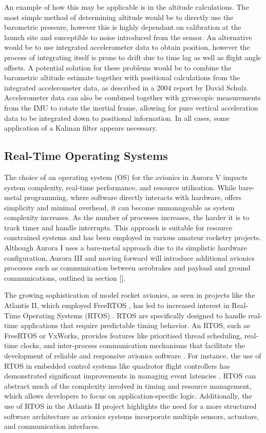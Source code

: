 An example of how this may be applicable is in the altitude calculations. The most simple method of determining altitude would be to directly use the barometric pressure, however this is highly dependant on calibration at the launch site and susceptible to noise introduced from the sensor. An alternative would be to use integrated accelerometer data to obtain position, however the process of integrating itself is prone to drift due to time lag as well as flight angle offsets. A potential solution for these problems would be to combine the barometric altitude estimate together with positional calculations from the integrated accelerometer data, as described in a 2004 report by David Schulz\cite{kalman-apogee}. Accelerometer data can also be combined together with gyroscopic measurements from the IMU to rotate the inertial frame, allowing for pure vertical acceleration data to be integrated down to positional information. In all cases, some application of a Kalman filter appears necessary.

\subsection{Real-Time Operating Systems}
The choice of an operating system (OS) for the avionics in Aurora V impacts system complexity, real-time performance, and resource utilisation. While bare-metal programming, where software directly interacts with hardware, offers simplicity and minimal overhead, it can become unmanageable as system complexity increases. As the number of processes increases, the harder it is to track timer and handle interrupts. This approach is suitable for resource constrained systems and has been employed in various amateur rocketry projects. Although Aurora I uses a bare-metal approach due to its simplistic hardware configuration, Aurora III and moving forward will introduce additional avionics processes such as communication between aerobrakes and payload and ground communications, outlined in section [].  

The growing sophistication of model rocket avionics, as seen in projects like the Atlantis II, which employed FreeRTOS \cite{Atlantis2018}, has led to increased interest in Real-Time Operating Systems (RTOS) \cite{Di2018}. RTOS are specifically designed to handle real-time applications that require predictable timing behavior. An RTOS, such as FreeRTOS or VxWorks, provides features like prioritised thread scheduling, real-time clocks, and inter-process communication mechanisms that facilitate the development of reliable and responsive avionics software \cite{Dietrich2017}. For instance, the use of RTOS in embedded control systems like quadrotor flight controllers has demonstrated significant improvements in managing event latencies \cite{Di2018}. RTOS can abstract much of the complexity involved in timing and resource management, which allows developers to focus on application-specific logic. Additionally, the use of RTOS in the Atlantis II project highlights the need for a more structured software architecture as avionics systems incorporate multiple sensors, actuators, and communication interfaces.  

